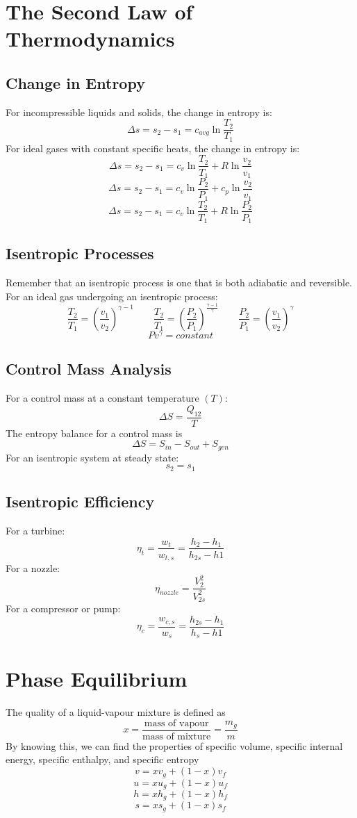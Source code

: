 \documentclass[11pt]{article}
\begin{document}
\section{The Second Law of Thermodynamics}
\subsection{Change in Entropy}
For incompressible liquids and solids, the change in entropy is:
$$ \Delta s = s_2 - s_1 = c_{avg} \ln \frac{T_2}{T_1} $$
For ideal gases with constant specific heats, the change in entropy is:
$$ \Delta s = s_2 - s_1 = c_v \ln \frac{T_2}{T_1} + R\ln \frac{v_2}{v_1} $$
$$ \Delta s = s_2 - s_1 = c_v \ln \frac{P_2}{P_1} + c_p \ln \frac{v_2}{v_1} $$
$$  \Delta s = s_2 - s_1 = c_v \ln \frac{T_2}{T_1} + R\ln \frac{P_2}{P_1} $$
\subsection{Isentropic Processes}
Remember that an isentropic process is one that is both adiabatic and reversible. For an ideal gas undergoing an isentropic process:
$$ \frac{T_2}{T_1} = \left(\frac{v_1}{v_2}\right)^{\gamma - 1} \quad \quad \frac{T_2}{T_1} = \left(\frac{P_2}{P_1}\right)^{\frac{\gamma - 1}{\gamma}} \quad \quad \frac{P_2}{P_1} = \left(\frac{v_1}{v_2}\right)^{\gamma}$$
\smallskip
$$ Pv^\gamma = constant$$
\subsection{Control Mass Analysis}
For a control mass at a constant temperature $(T)$:
$$ \Delta S = \frac{Q_{12}}{T}$$
The entropy balance for a control mass is 
$$ \Delta S = S_{in} - S_{out} + S_{gen} $$
For an isentropic system at steady state:
$$ s_2 = s_1$$
\subsection{Isentropic Efficiency}
For a turbine:
$$ \eta_t = \frac{w_t}{w_{t,s}} = \frac{h_2 - h_1}{h_{2s} - h1}$$
For a nozzle:
$$ \eta_{nozzle} = \frac{V_2^2}{V_{2s}^2}$$
For a compressor or pump:
$$ \eta_c = \frac{w_{c,s}}{w_{s}} = \frac{h_{2s} - h_1}{h_s - h1}$$
\pagebreak
\section{Phase Equilibrium}
The quality of a liquid-vapour mixture is defined as
$$ x = \frac{\text{mass of vapour}}{\text{mass of mixture}} = \frac{m_g}{m} $$
By knowing this, we can find the properties of specific volume, specific internal energy, specific enthalpy, and specific entropy
$$ v = xv_g + (1-x)v_f$$
$$ u = xu_g + (1-x)u_f$$
$$ h = xh_g + (1-x)h_f$$
$$ s = xs_g + (1-x)s_f$$
\pagebreak
\end{document}
